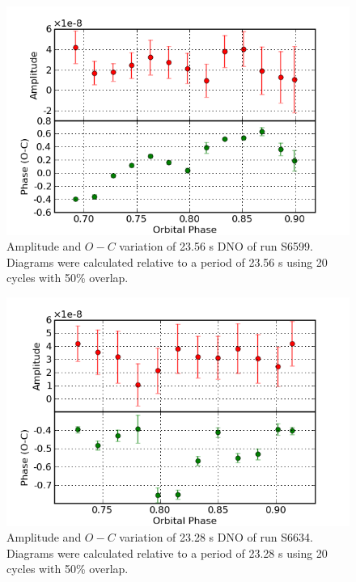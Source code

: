 \begin{figure}
 \centering
 \includegraphics[bb=0 0 600 400,width=0.85\columnwidth]{images/archive_phot/S6599/S6599_23.56.png}
 \caption[S6599 $O-C$ diagram of 23.56 s DNO]{Amplitude and $O-C$ variation of 23.56 s DNO of run S6599. Diagrams were calculated relative to a period of 23.56 s using 20 cycles with 50\% overlap. }
 \label{S6599_23.56}
\end{figure}

\begin{figure}
 \centering
 \includegraphics[bb=0 0 600 400,width=0.85\columnwidth]{images/archive_phot/S6634/S6634d_23.28.png}
 \caption[S6634 $O-C$ diagram of 23.28 s DNO]{Amplitude and $O-C$ variation of 23.28 s DNO of run S6634. Diagrams were calculated relative to a period of 23.28 s using 20 cycles with 50\% overlap. }
 \label{S6634_23.28}
\end{figure}

